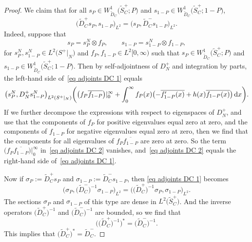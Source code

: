 \documentclass[10pt,a4paper]{article}
\numberwithin{equation}{section}
\begin{document}
\begin{proof}
We claim that for all $s_P \in W^1_{\widetilde{D}_C}\big(\widetilde{S}_C^+; P\big)$ and $s_{1-P} \in W^1_{\widetilde{D}_C}\big(\widetilde{S}_C^+; 1-P\big)$,
\begin{equation}
\label{eq adjoints DC 1}
\big(\widetilde{D}_C^+ s_P, s_{1-P}\big)_{L^2} = \big(s_P, \widetilde{D}_C^- s_{1-P}\big)_{L^2}.
\end{equation}
Indeed, suppose that
\[
s_P = s_P^N \otimes f_{P},\qquad s_{1-P} = s_{1-P}^N \otimes f_{1-P},
\]
for $s_P^N, s_{1-P}^N \in L^2\big(S^+|_N\big)$ and $f_P, f_{1-P} \in L^2[0, \infty)$ such that $s_P \in W^1_{\widetilde{D}_C}\big(\widetilde{S}_C^+; P\big)$ and $s_{1-P} \in W^1_{\widetilde{D}_C}\big(\widetilde{S}_C^+; 1-P\big)$. Then by self-adjointness of $D_N^+$ and integration by parts, the left-hand side of~\eqref{eq adjoints DC 1} equals
\begin{equation} \label{eq adjoints DC 2}
\big(s_P^N, D_N^+ s_{1-P}^N\big)_{L^2(S^+|_N)} \bigg(
\big(f_P \overline{f_{1-P}}\big)|_{0}^{\infty} + \int_0^{\infty} f_P(x)\bigl(-\overline{f_{1-P}'(x)} +h(x) \overline{f_{1-P}(x)}\bigr)\, {\rm d}x\bigg).
\end{equation}
If we further decompose the expressions with respect to eigenspaces of $D_N^+$, and use that the components of $f_P$ for positive eigenvalues equal zero at zero, and the components of $f_{1-P}$ for negative eigenvalues equal zero at zero, then we find that the components for all eigenvalues of $f_P \overline{f_{1-P}}$ are zero at zero. So the term $\big(f_P \overline{f_{1-P}}\big)|_{0}^{\infty} $ in~\eqref{eq adjoints DC 2} vanishes, and~\eqref{eq adjoints DC 2} equals the right-hand side of~\eqref{eq adjoints DC 1}.

Now if $\sigma_P := \widetilde{D}_C^+ s_P$ and $\sigma_{1-P} := \widetilde{D}_C^- s_{1-P}$, then
\eqref{eq adjoints DC 1} becomes
\[
\big( \sigma_P, \big(\widetilde{D}_C^-\big)^{-1} \sigma_{1-P}\big)_{L^2} = \big( \big(\widetilde{D}_C^+\big)^{-1}\sigma_P, \sigma_{1-P}\big)_{L^2}.
\]
The sections $\sigma_P$ and $\sigma_{1-P}$ of this type are dense in $L^2\big(\widetilde{S}_C^+\big)$. And the inverse operators $\big(\widetilde{D}_C^+\big)^{-1}$ and $\big(\widetilde{D}_C^-\big)^{-1}$ are bounded, so we find that
\[
\big(\big(\widetilde{D}_C^+\big)^{-1}\big)^* = \big(\widetilde{D}_C^-\big)^{-1}.
\]
This implies that $\big(\widetilde{D}_C^+\big)^* = \widetilde{D}_C^-$.
\end{proof}
\end{document}
